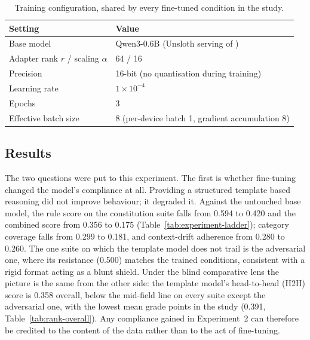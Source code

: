 \begin{table}[H]
  \centering
  \caption{Training configuration, shared by every fine-tuned condition in the study.}
  \label{tab:lora-config}
  \begin{tabular}{ll}
    \hline
    Setting & Value \\
    \hline
    Base model & Qwen3-0.6B (Unsloth serving of \cite{yang2025qwen3technicalreport}) \\
    Adapter rank $r$ / scaling $\alpha$ & 64 / 16 \\
    Precision & 16-bit (no quantisation during training) \\
    Learning rate & $1 \times 10^{-4}$ \\
    Epochs & 3 \\
    Effective batch size & 8 (per-device batch 1, gradient accumulation 8) \\
    \hline
  \end{tabular}
\end{table}


\subsection{Results}
\label{subsec:mr-exp1-results}

The two questions were put to this experiment. The first is whether fine-tuning changed the model's compliance at all. Providing a structured template based reasoning did not improve behaviour; it degraded it. Against the untouched base model, the rule score on the constitution suite falls from 0.594 to 0.420 and the combined score from 0.356 to 0.175 (Table~\ref{tab:experiment-ladder}); category coverage falls from 0.299 to 0.181, and context-drift adherence from 0.280 to 0.260. The one suite on which the template model does not trail is the adversarial one, where its resistance (0.500) matches the trained conditions, consistent with a rigid format acting as a blunt shield. Under the blind comparative lens the picture is the same from the other side: the template model's head-to-head (H2H) score is 0.358 overall, below the mid-field line on every suite except the adversarial one, with the lowest mean grade points in the study (0.391, Table~\ref{tab:rank-overall}). Any compliance gained in Experiment~2 can therefore be credited to the content of the data rather than to the act of fine-tuning.




